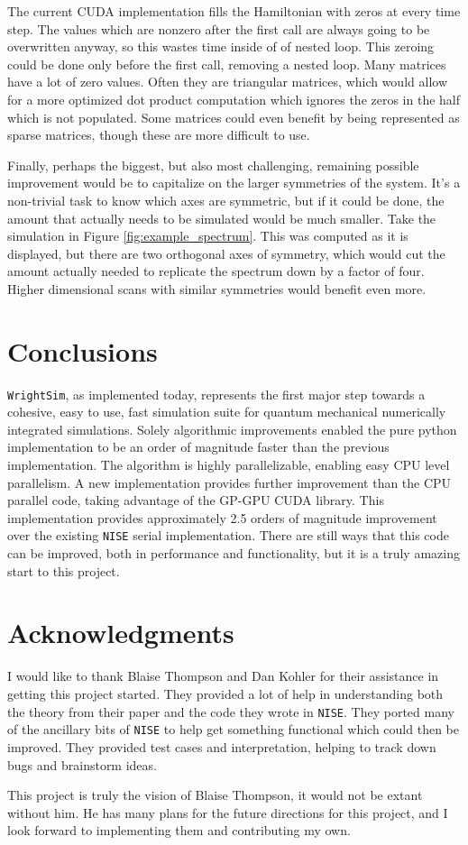 \documentclass[fontsize=11pt]{scrartcl}
\numberwithin{equation}{section}		%
\numberwithin{figure}{section}			%
\numberwithin{table}{section}				%
\begin{document}
The current CUDA implementation fills the Hamiltonian with zeros at every time step.
The values which are nonzero after the first call are always going to be overwritten anyway, so this wastes time inside of of nested loop.
This zeroing could be done only before the first call, removing a nested loop.
Many matrices have a lot of zero values. 
Often they are triangular matrices, which would allow for a more optimized dot product computation which ignores the zeros in the half which is not populated.
Some matrices could even benefit by being represented as sparse matrices, though these are more difficult to use.

Finally, perhaps the biggest, but also most challenging, remaining possible improvement would be to capitalize on the larger symmetries of the system.
It's a non-trivial task to know which axes are symmetric, but if it could be done, the amount that actually needs to be simulated would be much smaller.
Take the simulation in Figure \ref{fig:example_spectrum}.
This was computed as it is displayed, but there are two orthogonal axes of symmetry, which would cut the amount actually needed to replicate the spectrum down by a factor of four.
Higher dimensional scans with similar symmetries would benefit even more.

\section{Conclusions}
\texttt{WrightSim}, as implemented today, represents the first major step towards a cohesive, easy to use, fast simulation suite for quantum mechanical numerically integrated simulations.
Solely algorithmic improvements enabled the pure python implementation to be an order of magnitude faster than the previous implementation.
The algorithm is highly parallelizable, enabling easy CPU level parallelism.
A new implementation provides further improvement than the CPU parallel code, taking advantage of the GP-GPU CUDA library.
This implementation provides approximately 2.5 orders of magnitude improvement over the existing \texttt{NISE} serial implementation.
There are still ways that this code can be improved, both in performance and functionality, but it is a truly amazing start to this project.
\section{Acknowledgments}
I would like to thank Blaise Thompson and Dan Kohler for their assistance in getting this project started.
They provided a lot of help in understanding both the theory from their paper and the code they wrote in \texttt{NISE}.
They ported many of the ancillary bits of \texttt{NISE} to help get something functional which could then be improved.
They provided test cases and interpretation, helping to track down bugs and brainstorm ideas.

This project is truly the vision of Blaise Thompson, it would not be extant without him.
He has many plans for the future directions for this project, and I look forward to implementing them and contributing my own.

\newpage


\end{document}
